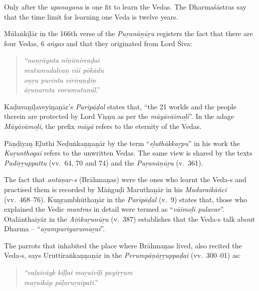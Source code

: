 Only after the \textit{upanayana} is one fit to learn the Vedas. The Dharmaśāstras say that the time limit for learning one Veda is twelve years.

Mūlaṅkiḻār in the 166th verse of the \textit{Puṟanāṉūṟu} registers the fact that there are four Vedas, 6 \textit{aṅgas} and that they originated from Lord Śiva:

\vskip -9pt

\begin{quote}
\textit{“naṉṟāynta nīṇimircaḍai}\\\textit{mutumudalvaṉ vāi pōkādu}\\\textit{oṉṟu purinta vīriraṇḍiṉ}\\\textit{āṟuṇarnta vorumutunūl}.”
\end{quote}

\vskip -9pt

Kaḍuvaṉiḷaveyiṉaṉār’s \textit{Paripāḍal} states that, “the 21 worlds and the people therein are protected by Lord Viṣṇu as per the \textit{māyāvāimoḻi}”. In the adage \textit{Māyāvāmoḻi}, the prefix \textit{māyā} refers to the eternity of the Vedas.

Pāṇḍiyaṉ Eḻuthi Neḍuṅkaṇṇaṉār by the term “\textit{eḻuthākkaṟpu}” in his work the \textit{Kuṟunthogai} refers to the unwritten Vedas. The same view is shared by the texts \textit{Padiṟṟuppattu} (vv.~64, 70 and 74) and the \textit{Puṟanāṉūṟu} (v.~361).

The fact that \textit{antaṇar-s} (Brāhmaṇas) were the ones who learnt the Veda-s and practised them is recorded by Māṅguḍi Maruthaṉār in his \textit{Maduraikāñci} (vv.~468–76). Kuṉṟambhūthaṉār in the \textit{Paripāḍal} (v.~9) states that, those who explained the Vedic \textit{mantras} in detail were termed as “\textit{vāimoḻi pulavar}”. Otalānthaiyār in the \textit{Aiṅkuṟunūṟu} (v.~387) establishes that the Veda-s talk about Dharma – “\textit{aṟampuriyarumaṟai}”.

The parrots that inhabited the place where Brāhmaṇas lived, also recited the Veda-s, says Uruttiraṅkaṇṇaṉār in the \textit{Perumpāṇāṟṟuppaḍai} (vv.~300–01) as:

\vskip -9pt

\begin{quote}
\textit{“vaḷaivāyk kiḷḷai maṟaiviḷi payiṟṟum}\\\textit{ maṟaikāp pāḷaruṟaipati}.”
\end{quote}

\vskip -9pt

